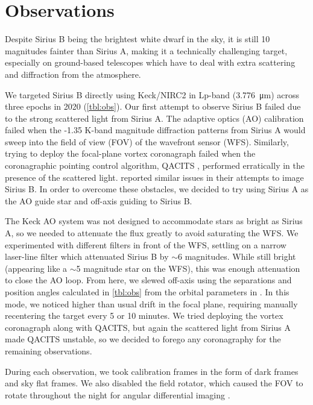 \documentclass[twocolumn]{aastex631}
\begin{document}
\section{Observations} \label{sec:obs}

Despite Sirius B being the brightest white dwarf in the sky, it is still 10 magnitudes fainter than Sirius A, making it a technically challenging target, especially on ground-based telescopes which have to deal with extra scattering and diffraction from the atmosphere.

We targeted Sirius B directly using Keck/NIRC2 in Lp-band (\qty{3.776}{\micro\meter}) across three epochs in 2020 (\autoref{tbl:obs}). Our first attempt to observe Sirius B failed due to the strong scattered light from Sirius A. The adaptive optics (AO) calibration failed when the -1.35 K-band magnitude diffraction patterns from Sirius A would sweep into the field of view (FOV) of the wavefront sensor (WFS). Similarly, trying to deploy the focal-plane vortex coronagraph \citep{serabyn_w_2017} failed when the coronagraphic pointing control algorithm, QACITS \citep{huby_w_2017}, performed erratically in the presence of the scattered light. \citet[\S2]{vigan_high-contrast_2015} reported similar issues in their attempts to image Sirius B. In order to overcome these obstacles, we decided to try using Sirius A as the AO guide star and off-axis guiding to Sirius B.

The Keck AO system \citep{wizinowich_performance_2000} was not designed to accommodate stars as bright as Sirius A, so we needed to attenuate the flux greatly to avoid saturating the WFS. We experimented with different filters in front of the WFS, settling on a narrow laser-line filter which attenuated Sirius B by $\sim$6 magnitudes. While still bright (appearing like a $\sim$5 magnitude star on the WFS), this was enough attenuation to close the AO loop. From here, we slewed off-axis using the separations and position angles calculated in \autoref{tbl:obs} from the orbital parameters in \cite{bond_sirius_2017}. In this mode, we noticed higher than usual drift in the focal plane, requiring manually recentering the target every 5 or 10 minutes. We tried deploying the vortex coronagraph along with QACITS, but again the scattered light from Sirius A made QACITS unstable, so we decided to forego any coronagraphy for the remaining observations.

During each observation, we took calibration frames in the form of dark frames and sky flat frames. We also disabled the field rotator, which caused the FOV to rotate throughout the night for angular differential imaging \citep[ADI;][]{marois_angular_2006}.
\end{document}
